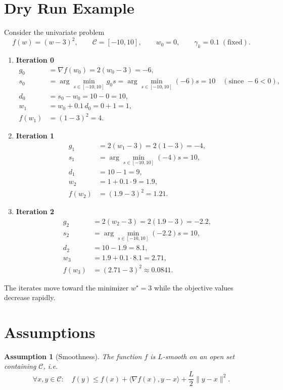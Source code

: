\documentclass{article}
\newtheorem{assumption}{Assumption}
\newcommand{\C}{\mathcal{C}}
\begin{document}
\section*{Dry Run Example}
Consider the univariate problem
\[
f(w)=(w-3)^{2},\qquad \C=[-10,10],\qquad w_{0}=0,\qquad \gamma_{k}=0.1\;( \text{fixed}).
\]

\begin{enumerate}[label=Iteration \arabic*:, leftmargin=*]
\item \textbf{Iteration 0}
    \begin{align*}
        g_{0}&=\nabla f(w_{0})=2(w_{0}-3)=-6,\\
        s_{0}&=\arg\min_{s\in[-10,10]} g_{0}s
               =\arg\min_{s\in[-10,10]} (-6)s
               =10 \quad(\text{since }-6<0),\\
        d_{0}&=s_{0}-w_{0}=10-0=10,\\
        w_{1}&=w_{0}+0.1\,d_{0}=0+1=1,\\
        f(w_{1})&=(1-3)^{2}=4.
    \end{align*}
\item \textbf{Iteration 1}
    \begin{align*}
        g_{1}&=2(w_{1}-3)=2(1-3)=-4,\\
        s_{1}&=\arg\min_{s\in[-10,10]} (-4)s =10,\\
        d_{1}&=10-1=9,\\
        w_{2}&=1+0.1\cdot9=1.9,\\
        f(w_{2})&=(1.9-3)^{2}=1.21.
    \end{align*}
\item \textbf{Iteration 2}
    \begin{align*}
        g_{2}&=2(w_{2}-3)=2(1.9-3)=-2.2,\\
        s_{2}&=\arg\min_{s\in[-10,10]} (-2.2)s =10,\\
        d_{2}&=10-1.9=8.1,\\
        w_{3}&=1.9+0.1\cdot8.1=2.71,\\
        f(w_{3})&=(2.71-3)^{2}\approx0.0841.
    \end{align*}
\end{enumerate}
The iterates move toward the minimizer $w^{\star}=3$ while the objective values decrease rapidly.

\newpage
\section*{Assumptions}
\begin{assumption}[Smoothness]\label{ass:smooth}
The function $f$ is $L$‑smooth on an open set containing $\C$, i.e.
\[
\forall x,y\in\C:\quad
f(y)\le f(x)+\langle\nabla f(x),y-x\rangle+\frac{L}{2}\|y-x\|^{2}.
\tag{5}
\]
\end{assumption}
\end{document}
